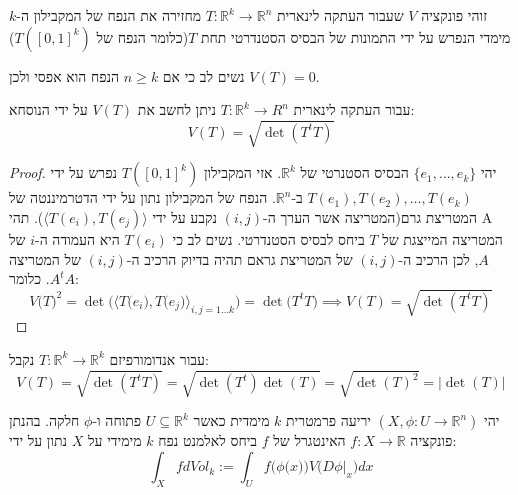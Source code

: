 \documentclass{tstextbook}
\begin{document}
\begin{definition}
זוהי פונקציה \(V\) שעבור העתקה לינארית \(T:\mathbb{R}^{k}\to \mathbb{R}^{n}\) מחזירה את הנפח של המקבילון ה-\(k\) מימדי הנפרש על ידי התמונות של הבסיס הסטנדרטי תחת \(T\)(כלומר הנפח של \(T([0,1]^{k})\))

\end{definition}
\begin{remark}
נשים לב כי אם \(n\geq k\) הנפח הוא אפסי ולכן \(V(T)=0\).

\end{remark}
\begin{proposition}
עבור העתקה לינארית \(T:\mathbb{R}^{k}\to R^{n}\) ניתן לחשב את \(V(T)\) על ידי הנוסחא:
$$V(T)={\sqrt{\operatorname*{det}(T^{t}T)}}$$

\end{proposition}
\begin{proof}
יהי \(\{ e_{1},\dots,e_{k} \}\) הבסיס הסטנרטי של \(\mathbb{R}^{k}\). אזי המקבילון \(T([0,1]^{k})\) נפרש על ידי \(T(e_{1}),T(e_{2}),\dots,T(e_{k})\) ב-\(\mathbb{R}^{n}\). הנפח של המקבילון נתון על ידי הדטרמיננטה של המטריצת גרם(המטריצה אשר הערך ה-\((i,j)\) נקבע על ידי \(\langle T(e_{i}),T(e_{j}) \rangle\)). תהי A המטריצה המייצגת של \(T\) ביחס לבסיס הסטנדרטי. נשים לב כי \(T(e_{i})\) היא העמודה ה-\(i\) של \(A\), לכן הרכיב ה-\((i,j)\) של המטריצת גראם תהיה בדיוק הרכיב ה-\((i,j)\) של המטריצה \(A^{t}A\). כלומר:
$$V{\big(}T{\big)}^{2}=\operatorname*{det}\!{\big(}\langle T{\big(}e_{i}{\big)},T{\big(}e_{j}{\big)}\rangle_{i,j=1\ldots k}{\big)}=\operatorname*{det}\!{\big(}T^{t}T{\big)}\implies V(T)=\sqrt{ \det (T^{t}T) }$$

\end{proof}
\begin{corollary}
עבור אנדומורפיזם \(T:\mathbb{R}^{k}\to \mathbb{R}^{k}\) נקבל:
$$V(T)=\sqrt{ \det(T^{t}T) }=\sqrt{ \det (T^{t})\det(T) }=\sqrt{ \det(T)^{2} }=\lvert \det(T) \rvert $$

\end{corollary}
\begin{definition}
יהי \((X,\phi:U\to \mathbb{R}^{n})\) יריעה פרמטרית \(k\) מימדית כאשר \(U\subseteq \mathbb{R}^{k}\) פתוחה ו-\(\phi\) חלקה. בהנתן פונקציה \(f:X\to \mathbb{R}\) האינטגרל של \(f\) ביחס לאלמנט נפח \(k\) מימידי על \(X\) נתון על ידי:
$$\int_{X}f d V o l_{k}:=\int_{U}f{\big(}\phi{\big(}x{\big)}{\big)}V{\big(}D\phi|_{x}{\big)}d x$$

\end{definition}
\end{document}
